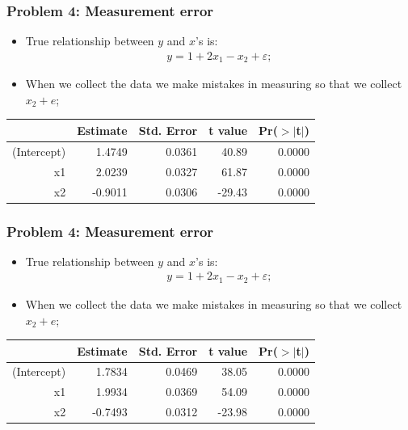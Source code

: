 \documentclass[aspectratio=169]{beamer}
\theoremstyle{principle}
\begin{document}
\begin{frame}
\frametitle{Problem 4: Measurement error}

\begin{itemize}
\item True relationship between $y$ and $x$'s is:
\begin{align*}
y = 1 + 2x_1 - x_2 + \varepsilon;
\end{align*}
\item When we collect the data we make mistakes in measuring so that we collect $x_2 + e$;
\end{itemize}

\begin{table}[ht]
\centering
\begin{tabular}{rrrrr}
  \hline
  \hline
 & Estimate & Std. Error & t value & Pr($>$$|$t$|$) \\ 
  \hline
    \hline
(Intercept) & 1.4749 & 0.0361 & 40.89 & 0.0000 \\ 
  x1 & 2.0239 & 0.0327 & 61.87 & 0.0000 \\ 
  x2 & -0.9011 & 0.0306 & -29.43 & 0.0000 \\ 
   \hline
      \hline
\end{tabular}
\end{table}

\end{frame}

\begin{frame}
\frametitle{Problem 4: Measurement error}

\begin{itemize}
\item True relationship between $y$ and $x$'s is:
\begin{align*}
y = 1 + 2x_1 - x_2 + \varepsilon;
\end{align*}
\item When we collect the data we make mistakes in measuring so that we collect $x_2 + e$;
\end{itemize}

\begin{table}[ht]
\centering
\begin{tabular}{rrrrr}
  \hline
  \hline
 & Estimate & Std. Error & t value & Pr($>$$|$t$|$) \\ 
  \hline
    \hline
(Intercept) & 1.7834 & 0.0469 & 38.05 & 0.0000 \\ 
  x1 & 1.9934 & 0.0369 & 54.09 & 0.0000 \\ 
  x2 & -0.7493 & 0.0312 & -23.98 & 0.0000 \\ 
   \hline
      \hline
\end{tabular}
\end{table}

\end{frame}
\end{document}
